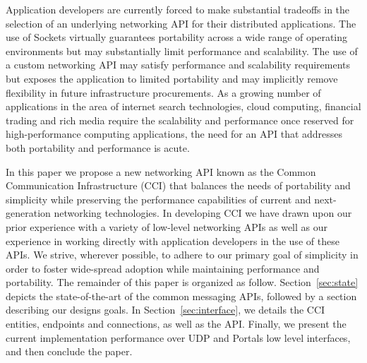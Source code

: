 Application developers are currently forced to make substantial
tradeoffs in the selection of an underlying networking API for their
distributed applications. The use of Sockets virtually guarantees
portability across a wide range of operating environments but may
substantially limit performance and scalability. The use of a custom
networking API may satisfy performance and scalability requirements
but exposes the application to limited portability and may implicitly
remove flexibility in future infrastructure procurements. As a growing
number of applications in the area of internet search technologies,
cloud computing, financial trading and rich media require the
scalability and performance once reserved for high-performance
computing applications, the need for an API that addresses both
portability and performance is acute.

In this paper we propose a new networking API known as the Common
Communication Infrastructure (CCI) that balances the needs of
portability and simplicity while preserving the performance
capabilities of current and next-generation networking
technologies. In developing CCI we have drawn upon our prior
experience with a variety of low-level networking APIs as well as our
experience in working directly with application developers in the use
of these APIs. We strive, wherever possible, to adhere to our primary
goal of simplicity in order to foster wide-spread adoption while
maintaining performance and portability. The remainder of this paper
is organized as follow.  Section~\ref{sec:state} depicts the
state-of-the-art of the common messaging APIs, followed by a section
describing our designs goals.  In Section~\ref{sec:interface}, we
details the CCI entities, endpoints and connections, as well as the
API. Finally, we present the current implementation performance over
UDP and Portals low level interfaces, and then conclude the paper.


